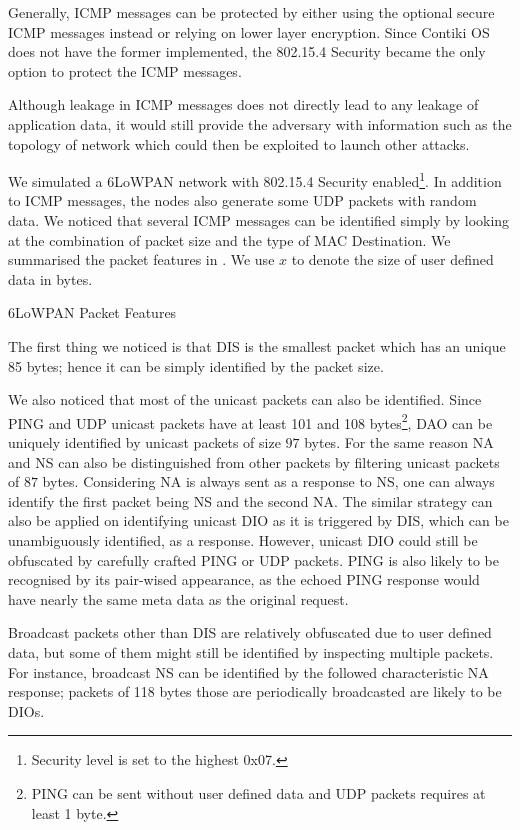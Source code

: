 Generally, ICMP messages can be protected by either using the optional secure ICMP messages instead or relying on lower layer encryption. Since Contiki OS does not have the former implemented, the 802.15.4 Security became the only option to protect the ICMP messages.

Although leakage in ICMP messages does not directly lead to any leakage of application data, it would still provide the adversary with information such as the topology of network which could then be exploited to launch other attacks.

We simulated a 6LoWPAN network with 802.15.4 Security enabled\footnote{Security level is set to the highest 0x07.}. In addition to ICMP messages, the nodes also generate some UDP packets with random data. We noticed that several ICMP messages can be identified simply by looking at the combination of packet size and the type of MAC Destination. We summarised the packet features in . We use $x$ to denote the size of user defined data in bytes.

\begin{table}
	\center
	
	\caption{6LoWPAN Packet Features\label{IcmpPacketFeature}}
\end{table}

The first thing we noticed is that DIS is the smallest packet which has an unique 85 bytes; hence it can be simply identified by the packet size.

We also noticed that most of the unicast packets can also be identified. Since PING and UDP unicast packets have at least 101 and 108 bytes\footnote{PING can be sent without user defined data and UDP packets requires at least 1 byte.}, DAO can be uniquely identified by unicast packets of size $97$ bytes. For the same reason NA and NS can also be distinguished from other packets by filtering unicast packets of $87$ bytes. Considering NA is always sent as a response to NS, one can always identify the first packet being NS and the second NA. The similar strategy can also be applied on identifying unicast DIO as it is triggered by DIS, which can be unambiguously identified, as a response. However, unicast DIO could still be obfuscated by carefully crafted PING or UDP packets. PING is also likely to be recognised by its pair-wised appearance, as the echoed PING response would have nearly the same meta data as the original request.

Broadcast packets other than DIS are relatively obfuscated due to user defined data, but some of them might still be identified by inspecting multiple packets. For instance, broadcast NS can be identified by the followed characteristic NA response; packets of 118 bytes those are periodically broadcasted are likely to be DIOs.

